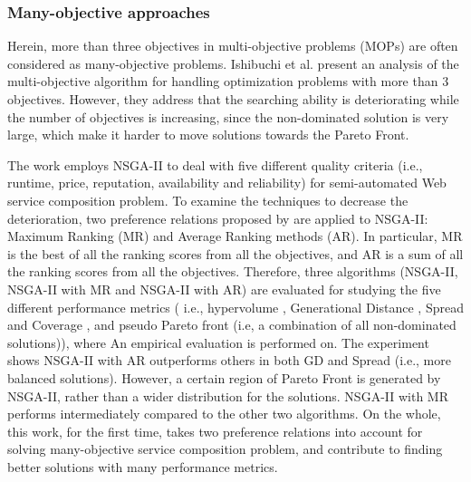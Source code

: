 \subsubsection{Many-objective approaches}\label{ManyObjective}

Herein, more than three objectives in multi-objective problems (MOPs) are often considered as many-objective problems. Ishibuchi et al. \cite{ishibuchi2008evolutionary} present an analysis of the multi-objective algorithm for handling optimization problems with more than 3 objectives. However, they address that the searching ability is deteriorating while the number of objectives is increasing, since the non-dominated solution is very large, which make it harder to move solutions towards the Pareto Front.

The work \cite{de2010many} employs NSGA-II to deal with five different quality criteria (i.e., runtime, price, reputation, availability and reliability) for semi-automated Web service composition problem.  To examine the techniques to decrease the deterioration, two preference relations proposed by \cite{bentley1997finding} are applied to NSGA-II: Maximum Ranking (MR) and Average Ranking methods (AR). In particular, MR is the best of all the ranking scores from all the objectives, and AR is a sum of all the ranking scores from all the objectives. Therefore, three algorithms (NSGA-II, NSGA-II with MR and NSGA-II with AR) are evaluated for studying the five different performance metrics ( i.e., hypervolume \cite{zitzler1999evolutionary}, Generational Distance \cite{van2000measuring}, Spread and Coverage \cite{zitzler2000comparison}, and pseudo Pareto front (i.e, a combination of all non-dominated solutions)),  where An empirical evaluation is performed on. The experiment shows NSGA-II with AR outperforms others in both GD and Spread (i.e., more balanced solutions). However,  a certain region of  Pareto Front is generated by NSGA-II,  rather than a wider distribution for the solutions. NSGA-II with MR performs intermediately compared to the other two algorithms. On the whole,  this work, for the first time, takes two preference relations into account for solving many-objective service composition problem, and contribute to finding better solutions with many performance metrics.



